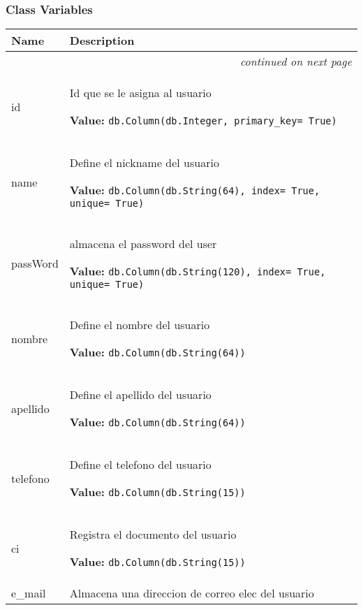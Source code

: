 
  \subsubsection{Class Variables}

    \vspace{-1cm}
\hspace{\varindent}\begin{longtable}{|p{\varnamewidth}|p{\vardescrwidth}|l}
\cline{1-2}
\cline{1-2} \centering \textbf{Name} & \centering \textbf{Description}& \\
\cline{1-2}
\endhead\cline{1-2}\multicolumn{3}{r}{\small\textit{continued on next page}}\\\endfoot\cline{1-2}
\endlastfoot\raggedright i\-d\- & \raggedright Id que se le asigna al usuario

\textbf{Value:} 
{\tt db.Column(db.Integer, primary\_key= True)}&\\
\cline{1-2}
\raggedright n\-a\-m\-e\- & \raggedright Define el nickname del usuario

\textbf{Value:} 
{\tt db.Column(db.String(64), index= True, unique= True)}&\\
\cline{1-2}
\raggedright p\-a\-s\-s\-W\-o\-r\-d\- & \raggedright almacena el password del user

\textbf{Value:} 
{\tt db.Column(db.String(120), index= True, unique= True)}&\\
\cline{1-2}
\raggedright n\-o\-m\-b\-r\-e\- & \raggedright Define el nombre del usuario

\textbf{Value:} 
{\tt db.Column(db.String(64))}&\\
\cline{1-2}
\raggedright a\-p\-e\-l\-l\-i\-d\-o\- & \raggedright Define el apellido del usuario

\textbf{Value:} 
{\tt db.Column(db.String(64))}&\\
\cline{1-2}
\raggedright t\-e\-l\-e\-f\-o\-n\-o\- & \raggedright Define el telefono del usuario

\textbf{Value:} 
{\tt db.Column(db.String(15))}&\\
\cline{1-2}
\raggedright c\-i\- & \raggedright Registra el documento del usuario

\textbf{Value:} 
{\tt db.Column(db.String(15))}&\\
\cline{1-2}
\raggedright e\-\_\-m\-a\-i\-l\- & \raggedright Almacena una direccion de correo elec del usuario


\end{longtable}
